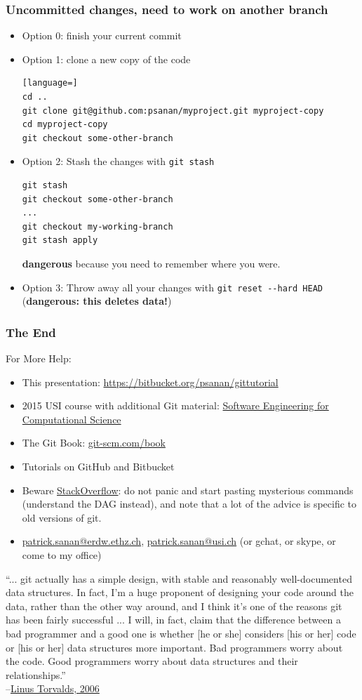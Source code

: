 \documentclass{beamer}
\begin{document}
\begin{frame}[fragile]
\frametitle{Uncommitted changes, need to work on another branch}
\begin{itemize}
\item Option 0: finish your current commit
\item Option 1: clone a new copy of the code
\begin{lstlisting}[language=]
cd ..
git clone git@github.com:psanan/myproject.git myproject-copy
cd myproject-copy
git checkout some-other-branch
\end{lstlisting}
\item Option 2: Stash the changes with \lstinline{git stash}
\begin{lstlisting}
git stash
git checkout some-other-branch
...
git checkout my-working-branch
git stash apply
\end{lstlisting}
\textbf{dangerous} because you need to remember where you were.
\item Option 3: Throw away all your changes with \lstinline{git reset --hard HEAD} (\textbf{dangerous: this deletes data!})
\end{itemize}
\end{frame}

\begin{frame}[fragile]
\frametitle{The End}

For More Help:
\begin{itemize}
\item This presentation: \href{https://bitbucket.org/psanan/gittutorial}{https://bitbucket.org/psanan/gittutorial}
\item 2015 USI course with additional Git material: \href{https://bitbucket.org/psanan/sefcs2015}{Software Engineering for Computational Science}
\item
The Git Book: \href{https://git-scm.com/book}{git-scm.com/book}
\item
Tutorials on GitHub and Bitbucket
\item
  Beware \href{https://www.stackoverflow.com}{StackOverflow}: do not panic and start pasting mysterious commands (understand the DAG instead), and note that a lot of the advice is specific to old versions of git.
\item \href{mailto:patrick.sanan@erdw.ethz.ch}{patrick.sanan@erdw.ethz.ch}, \href{mailto:patrick.sanan@usi.ch}{patrick.sanan@usi.ch} (or gchat, or skype, or come to my office)
\end{itemize}
\vspace{30px}
{\tiny ``... git actually has a simple design, with stable and reasonably well-documented data structures.
In fact, I'm a huge proponent of designing your code around the data, rather than the other
way around, and I think it's one of the reasons git has been fairly successful ... I will, in
fact, claim that the difference between a bad programmer and a good one is whether [he or she]
considers [his or her] code or [his or her] data structures more important. Bad programmers worry
about the code. Good programmers worry about data structures and their relationships.''\\
--\href{http://lwn.net/Articles/193245/}{Linus Torvalds, 2006}
}
\end{frame}
\end{document}
